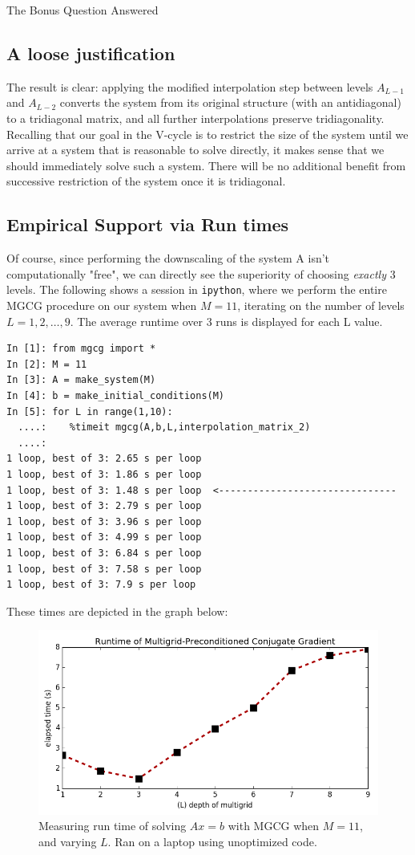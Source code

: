 \documentclass[10pt]{article}
\theoremstyle{definition}
\begin{document}
\begin{section}{The Bonus Question Answered}
\subsection{A loose justification}
The result is clear: applying the modified interpolation step between levels $A_{L-1}$ and $A_{L-2}$ converts the system from its original structure (with an antidiagonal) to a tridiagonal matrix, and all further interpolations preserve tridiagonality. Recalling that our goal in the V-cycle is to restrict the size of the system until we arrive at a system that is reasonable to solve directly, it makes sense that we should immediately solve such a system. There will be no additional benefit from successive restriction of the system once it is tridiagonal.


\clearpage
\subsection{Empirical Support via Run times}
Of course, since performing the downscaling of the system A isn't computationally "free", we can directly see the superiority of choosing \textit{exactly} 3 levels. The following shows a session in \texttt{ipython}, where we perform the entire MGCG procedure on our system when $M=11$, iterating on the number of levels $L=1,2,\dots,9$. The average runtime over 3 runs is displayed for each L value. 

\begin{verbatim}
In [1]: from mgcg import * 
In [2]: M = 11
In [3]: A = make_system(M)
In [4]: b = make_initial_conditions(M)
In [5]: for L in range(1,10):
  ....:    %timeit mgcg(A,b,L,interpolation_matrix_2)
  ....:     
1 loop, best of 3: 2.65 s per loop
1 loop, best of 3: 1.86 s per loop
1 loop, best of 3: 1.48 s per loop	<-------------------------------
1 loop, best of 3: 2.79 s per loop
1 loop, best of 3: 3.96 s per loop
1 loop, best of 3: 4.99 s per loop
1 loop, best of 3: 6.84 s per loop
1 loop, best of 3: 7.58 s per loop
1 loop, best of 3: 7.9 s per loop
\end{verbatim}

These times are depicted in the graph below:
\begin{figure}[h]
\begin{center}
\includegraphics[width=0.8\linewidth]{runtimes.png}
\caption{Measuring run time of solving $Ax=b$ with MGCG when $M=11$, and varying $L$. Ran on a laptop using unoptimized code.}
\end{center}
\end{figure}
\pagebreak

\end{section}
\end{document}
